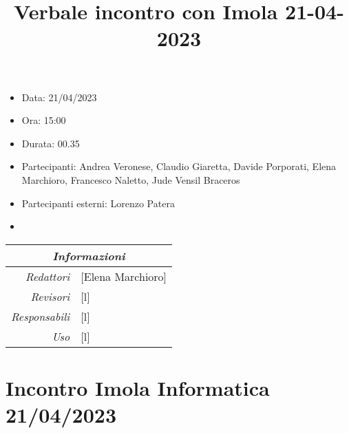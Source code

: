 \documentclass[12pt]{article}
\begin{document}
\graphicspath{ {../templates/img} }

\title{Verbale incontro con Imola 21-04-2023}
\firstPage
\maketitle

\begin{center}
    \begin{itemize}
        \item[] Data: 21/04/2023
        \item[] Ora: 15:00
        \item[] Durata: 00.35
        \item[] Partecipanti: Andrea Veronese, Claudio Giaretta, Davide Porporati, Elena Marchioro, Francesco Naletto, Jude Vensil Braceros
        \item[] Partecipanti esterni: Lorenzo Patera
        \item[] 
        \end{itemize}
    \begin{tabular}{r | l}
		\multicolumn{2}{c}{\textit{Informazioni}}\\
		\hline
		
			\textit{Redattori} &
			[Elena Marchioro]\makecell{}\\
		
			\textit{Revisori} &
			[l]\makecell{}\\
			\textit{Responsabili} &
			[l]\makecell{}\\
		      \textit{Uso} & 
                [l]\makecell{}\\
\end{tabular}
\end{center}

\tableofcontents
\printindex
\section{Incontro Imola Informatica 21/04/2023}
\end{document}
